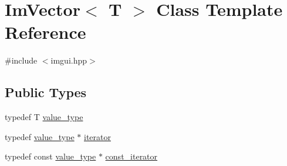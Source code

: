 \hypertarget{class_im_vector}{}\section{Im\+Vector$<$ T $>$ Class Template Reference}
\label{class_im_vector}


{\ttfamily \#include $<$imgui.\+hpp$>$}

\subsection*{Public Types}
\begin{DoxyCompactItemize}
\item 
typedef T \hyperlink{class_im_vector_a8bd77e4e7581d8e5f9e98d7c2f3c2a80}{value\+\_\+type}
\item 
typedef \hyperlink{class_im_vector_a8bd77e4e7581d8e5f9e98d7c2f3c2a80}{value\+\_\+type} $\ast$ \hyperlink{class_im_vector_a74b5478f1f6fd471cc71219bce483db6}{iterator}
\item 
typedef const \hyperlink{class_im_vector_a8bd77e4e7581d8e5f9e98d7c2f3c2a80}{value\+\_\+type} $\ast$ \hyperlink{class_im_vector_aedeac9c5080f9d6ce96ae837768ee4c4}{const\+\_\+iterator}
\end{DoxyCompactItemize}
